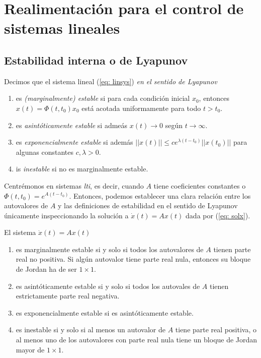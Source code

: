\chapter{Realimentación para el control de sistemas lineales}\label{crllineales}

\section{Estabilidad interna o de Lyapunov}
\label{sec: sta}

Decimos que el sistema lineal (\ref{eq: linsys}) \emph{en el sentido de Lyapunov}
\begin{enumerate}
	\item es \emph{(marginalmente) estable} si para cada condición inicial $x_0$, entonces $x(t) = \Phi(t,t_0) x_0$ está acotada uniformamente para todo $t>t_0$.
	\item es \emph{asintóticamente estable} si admeás $x(t) \to 0$ según $t\to\infty$.
	\item es \emph{exponencialmente estable} si además $||x(t)|| \leq c e^{\lambda(t-t_0)}||x(t_0)||$ para algunas constantes $c,\lambda > 0$.
	\item is \emph{inestable} si no es marginalmente estable.
\end{enumerate}


Centrémonos en sistemas \emph{lti}, es decir, cuando $A$ tiene coeficientes constantes o $\Phi(t,t_0) = e^{A(t-t_0)}$. Entonces, podemos establecer una clara relación entre los autovalores de $A$ y las definiciones de estabilidad en el sentido de Lyapunov únicamente inspeccionando la solución a $\dot x(t) = Ax(t)$ dada por (\ref{eq: solx}).

El sistema $\dot x(t) = Ax(t)$
\begin{enumerate}
	\item es marginalmente estable si y solo si todos los autovalores de $A$ tienen parte real no positiva. Si algún autovalor tiene parte real nula, entonces su bloque de Jordan ha de ser $1\times 1$.
	\item es asintóticamente estable si y solo si todos los autovales de $A$ tienen estrictamente parte real negativa.
	\item es exponencialmente estable si es asintóticamente estable.
	\item es inestable si y solo si al menos un autovalor de $A$ tiene parte real positiva, o al menos uno de los autovalores con parte real nula tiene un bloque de Jordan mayor de $1\times 1$.
\end{enumerate}

